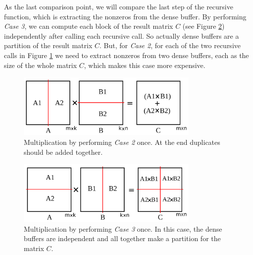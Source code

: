As the last comparison point, we will compare the last step of the recursive function, which is extracting the nonzeros from the dense buffer.
By performing \textit{Case 3}, we can compute each block of the result matrix $C$ (see Figure \ref{fig:skinny2}) independently after calling each recursive call. So actually dense buffers are a partition of the result matrix $C$. But, for \textit{Case 2}, for each of the two recursive calls in Figure \ref{fig:skinny1} we need to extract nonzeros from two dense buffers, each as the size of the whole matrix $C$, which makes this case more expensive.


\begin{figure}[thb]
    \includegraphics[width=8.8cm,height=3.1cm]{./figures/skinny001.pdf}
    \caption{Multiplication by performing \textit{Case 2} once. At the end duplicates should be added together.}
    \label{fig:skinny1}
\end{figure}

\begin{figure}[thb]
    \includegraphics[width=8.8cm,height=3.1cm]{./figures/skinny002.pdf}
    \caption{Multiplication by performing \textit{Case 3} once. In this case, the dense buffers are independent and all together make a partition for the matrix $C$.}
    \label{fig:skinny2}
\end{figure}




